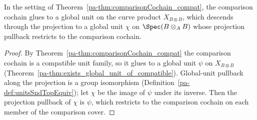 \begin{theorem}
  \label{pa-thm:exists_comparison_unit}
  \leanok

  In the setting of Theorem~\ref{pa-thm:comparisonCochain_compat}, the comparison cochain glues to
  a global unit on the curve product \(X_{B \otimes B}\), which descends through the projection
  to a global unit \(\chi\) on \(\Spec(B \otimes_A B)\) whose projection pullback restricts to
  the comparison cochain.
\end{theorem}
\begin{proof}
  \leanok
  By Theorem~\ref{pa-thm:comparisonCochain_compat} the comparison cochain is a compatible unit
  family, so it glues to a global unit \(\psi\) on \(X_{B \otimes B}\)
  (Theorem~\ref{pa-thm:exists_global_unit_of_compatible}). Global-unit pullback along the
  projection is a group isomorphism (Definition~\ref{pa-def:unitsSndTopEquiv}); let \(\chi\) be the
  image of \(\psi\) under its inverse. Then the projection pullback of \(\chi\) is \(\psi\),
  which restricts to the comparison cochain on each member of the comparison cover.
\end{proof}

